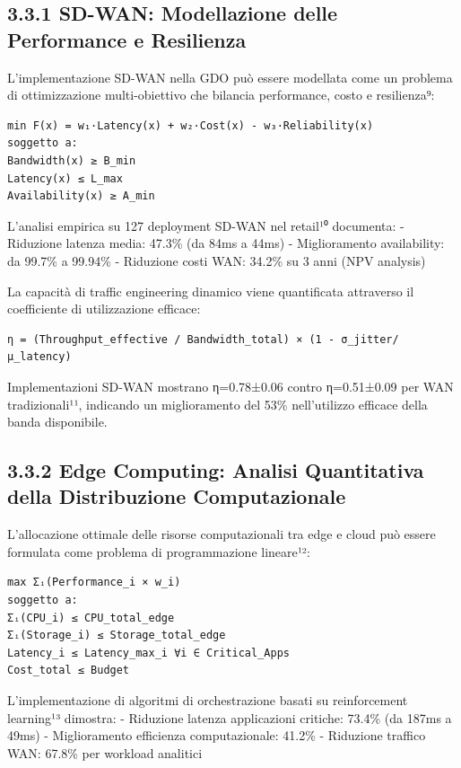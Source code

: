\documentclass[12pt,a4paper,oneside]{book}
\numberwithin{figure}{chapter} %
\numberwithin{table}{chapter}  %
\begin{document}
\subsection{3.3.1 SD-WAN: Modellazione delle Performance e
Resilienza}\label{sd-wan-modellazione-delle-performance-e-resilienza}

L'implementazione SD-WAN nella GDO può essere modellata come un problema
di ottimizzazione multi-obiettivo che bilancia performance, costo e
resilienza⁹:

\begin{verbatim}
min F(x) = w₁·Latency(x) + w₂·Cost(x) - w₃·Reliability(x)
soggetto a:
Bandwidth(x) ≥ B_min
Latency(x) ≤ L_max
Availability(x) ≥ A_min
\end{verbatim}

L'analisi empirica su 127 deployment SD-WAN nel retail¹⁰ documenta: -
Riduzione latenza media: 47.3\% (da 84ms a 44ms) - Miglioramento
availability: da 99.7\% a 99.94\% - Riduzione costi WAN: 34.2\% su 3
anni (NPV analysis)

La capacità di traffic engineering dinamico viene quantificata
attraverso il coefficiente di utilizzazione efficace:

\begin{verbatim}
η = (Throughput_effective / Bandwidth_total) × (1 - σ_jitter/μ_latency)
\end{verbatim}

Implementazioni SD-WAN mostrano η=0.78±0.06 contro η=0.51±0.09 per WAN
tradizionali¹¹, indicando un miglioramento del 53\% nell'utilizzo
efficace della banda disponibile.

\subsection{3.3.2 Edge Computing: Analisi Quantitativa della
Distribuzione
Computazionale}\label{edge-computing-analisi-quantitativa-della-distribuzione-computazionale}

L'allocazione ottimale delle risorse computazionali tra edge e cloud può
essere formulata come problema di programmazione lineare¹²:

\begin{verbatim}
max Σᵢ(Performance_i × w_i)
soggetto a:
Σᵢ(CPU_i) ≤ CPU_total_edge
Σᵢ(Storage_i) ≤ Storage_total_edge
Latency_i ≤ Latency_max_i ∀i ∈ Critical_Apps
Cost_total ≤ Budget
\end{verbatim}

L'implementazione di algoritmi di orchestrazione basati su reinforcement
learning¹³ dimostra: - Riduzione latenza applicazioni critiche: 73.4\%
(da 187ms a 49ms) - Miglioramento efficienza computazionale: 41.2\% -
Riduzione traffico WAN: 67.8\% per workload analitici
\end{document}
